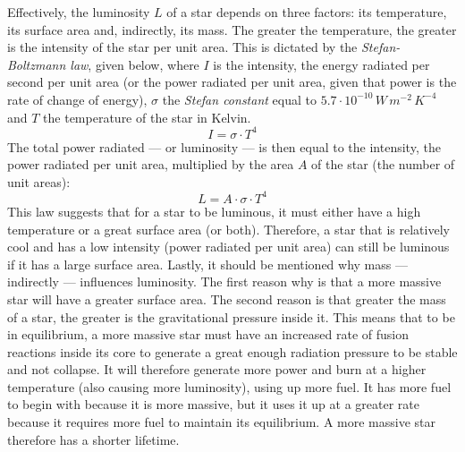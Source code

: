 \begin{figure}[h!]
\end{figure}

Effectively, the luminosity $L$ of a star depends on three factors: its temperature, its surface area and, indirectly, its mass. The greater the temperature, the greater is the intensity of the star per unit area. This is dictated by the \emph{Stefan-Boltzmann law}, given below, where $I$ is the intensity, the energy radiated per second per unit area (or the power radiated per unit area, given that power is the rate of change of energy), $\sigma$ the \emph{Stefan constant} equal to $5.7 \cdot 10^{-10} \, W\, m^{-2}\, K^{-4}$ and $T$ the temperature of the star in Kelvin. $$I = \sigma \cdot T^4$$ The total power radiated --- or luminosity --- is then equal to the intensity, the power radiated per unit area, multiplied by the area $A$ of the star (the number of unit areas): $$L = A \cdot \sigma \cdot T^4$$ This law suggests that for a star to be luminous, it must either have a high temperature or a great surface area (or both). Therefore, a star that is relatively cool and has a low intensity (power radiated per unit area) can still be luminous if it has a large surface area. Lastly, it should be mentioned why mass --- indirectly --- influences luminosity. The first reason why is that a more massive star will have a greater surface area. The second reason is that greater the mass of a star, the greater is the gravitational pressure inside it. This means that to be in equilibrium, a more massive star must have an increased rate of fusion reactions inside its core to generate a great enough radiation pressure to be stable and not collapse. It will therefore generate more power and burn at a higher temperature (also causing more luminosity), using up more fuel. It has more fuel to begin with because it is more massive, but it uses it up at a greater rate because it requires more fuel to maintain its equilibrium. A more massive star therefore has a shorter lifetime.

